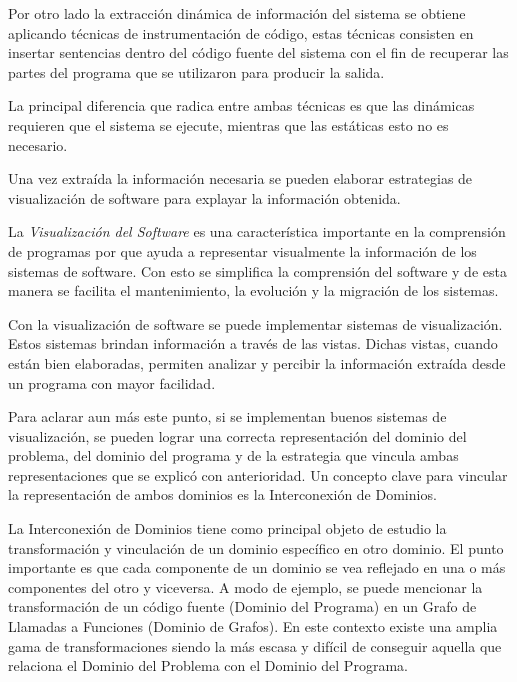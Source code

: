 \documentclass[a4paper,12pt]{report}
\begin{document}
Por otro lado la extracción dinámica de información del sistema se obtiene aplicando técnicas de instrumentación de código, estas técnicas consisten en insertar sentencias dentro del código fuente del sistema con el fin de recuperar las partes del programa que se utilizaron para producir la salida\cite{THBE99}.
 
La principal diferencia que radica entre ambas técnicas es que las dinámicas requieren que el sistema se ejecute, mientras que las estáticas esto no es necesario.

Una vez extraída la información necesaria se pueden elaborar estrategias de visualización de software para explayar la información obtenida.


La \textit{Visualización del Software} es una característica importante en la comprensión de programas por que ayuda a representar visualmente la información de los sistemas de software\cite{BRM10}. Con esto se simplifica la comprensión del software y de esta manera se facilita el mantenimiento, la evolución y la migración de los sistemas.

Con la visualización de software se puede implementar sistemas de visualización. Estos sistemas brindan información a través de las vistas. Dichas vistas, cuando están bien elaboradas, permiten analizar y percibir la información extraída desde un programa con mayor facilidad.

Para aclarar aun más este punto, si se implementan buenos sistemas de visualización, se pueden lograr una correcta representación del dominio del problema, del dominio del programa y de la estrategia que vincula ambas representaciones que se explicó con anterioridad. Un concepto clave para vincular la representación de ambos dominios es la Interconexión de Dominios.



La Interconexión de Dominios tiene como principal objeto de estudio la transformación y vinculación de un dominio específico en otro dominio\cite{MPMR07}. 
El punto importante es que cada componente de un dominio se vea reflejado en una o más componentes del otro y viceversa. 
A modo de ejemplo, se puede mencionar la transformación de un código fuente (Dominio del Programa) en un Grafo de Llamadas a Funciones (Dominio de Grafos). En este contexto existe una amplia gama de transformaciones siendo la más escasa y difícil de conseguir aquella que relaciona el Dominio del Problema con el Dominio del Programa.
\end{document}
